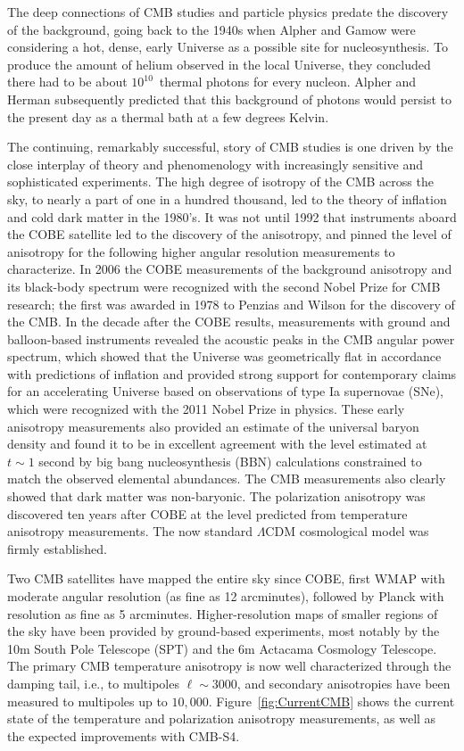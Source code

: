 The deep connections of CMB studies and particle physics predate the discovery of the background, going back to the 1940s when Alpher and Gamow were considering a hot, dense, early Universe as a possible site for nucleosynthesis. To produce the
amount of helium observed in the local Universe, they concluded there
had to be about $10^{10}$\ thermal photons for every nucleon. Alpher and Herman subsequently predicted that this background of photons would persist to the present day as a thermal bath at a few degrees Kelvin.

The continuing, remarkably successful, story of CMB studies is one driven by the close interplay of theory and phenomenology with increasingly sensitive and sophisticated experiments. The high degree of isotropy of the CMB across the sky, to nearly a part of one in a hundred thousand, led to the theory of inflation and cold dark matter in the 1980's. It was not until 1992 that instruments aboard the COBE satellite led to the discovery of the anisotropy, and pinned the level of anisotropy for the following higher angular resolution measurements to characterize. In 2006 the COBE measurements of the background anisotropy and its black-body spectrum were recognized with the second Nobel Prize for CMB research; the first was awarded in 1978 to Penzias and Wilson for the discovery of the CMB.  In the decade after the COBE results, measurements with ground and balloon-based instruments revealed the acoustic peaks in the CMB angular power spectrum, which showed that the Universe was geometrically flat in accordance with predictions of inflation and provided strong support for contemporary claims for an accelerating Universe based on observations of type Ia supernovae (SNe), which were recognized with the 2011 Nobel Prize in physics. These early anisotropy measurements also provided an estimate of the universal baryon density and found it to be in excellent agreement with the level estimated at $t \sim 1$ second by big bang nucleosynthesis (BBN) calculations constrained to match the observed elemental abundances. The CMB measurements also clearly showed that dark matter was non-baryonic. The polarization anisotropy was discovered ten years after COBE at the level predicted from temperature anisotropy measurements. The now standard $\Lambda$CDM cosmological model was firmly established.

Two CMB satellites have mapped the entire sky since COBE, first WMAP with moderate angular resolution (as fine as 12 arcminutes), followed by Planck with resolution as fine as 5 arcminutes. Higher-resolution maps of smaller regions of the sky have been provided by ground-based experiments, most notably by the 10m South Pole Telescope (SPT) and the 6m Actacama Cosmology Telescope. The primary CMB temperature anisotropy is now well characterized through the damping tail, i.e., to multipoles $\ell \sim 3000$, and secondary anisotropies have been measured to multipoles up to  $10,000$.  Figure~\ref{fig:CurrentCMB} shows the current state of the temperature and polarization anisotropy measurements, as well as the expected improvements with CMB-S4.


